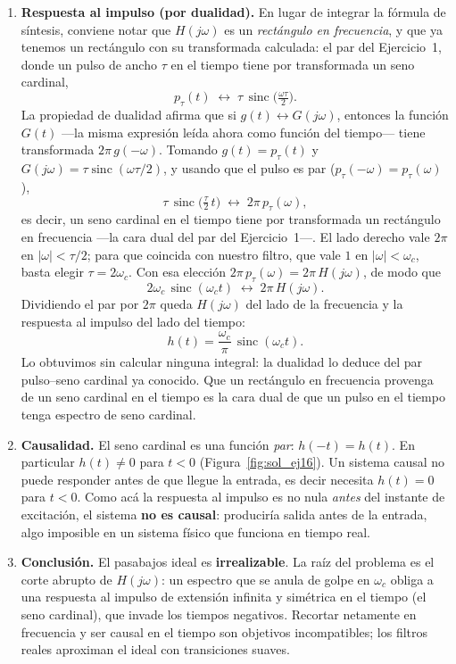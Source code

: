 \documentclass[10pt,a4paper]{article}
\begin{document}
	\begin{enumerate}[label=\textbf{\alph*)}]
		\item \textbf{Respuesta al impulso (por dualidad).} En lugar de integrar la fórmula de síntesis, conviene notar que $H(j\omega)$ es un \emph{rectángulo en frecuencia}, y que ya tenemos un rectángulo con su transformada calculada: el par del Ejercicio~1, donde un pulso de ancho $\tau$ en el tiempo tiene por transformada un seno cardinal,
		\[
			p_\tau(t) \;\leftrightarrow\; \tau\,\operatorname{sinc}\!\Big(\tfrac{\omega\tau}{2}\Big).
		\]
		La propiedad de dualidad afirma que si $g(t)\leftrightarrow G(j\omega)$, entonces la función $G(t)$ ---la misma expresión leída ahora como función del tiempo--- tiene transformada $2\pi\,g(-\omega)$. Tomando $g(t)=p_\tau(t)$ y $G(j\omega)=\tau\operatorname{sinc}(\omega\tau/2)$, y usando que el pulso es par ($p_\tau(-\omega)=p_\tau(\omega)$),
		\[
			\tau\,\operatorname{sinc}\!\Big(\tfrac{\tau}{2}\,t\Big) \;\leftrightarrow\; 2\pi\,p_\tau(\omega),
		\]
		es decir, un seno cardinal en el tiempo tiene por transformada un rectángulo en frecuencia ---la cara dual del par del Ejercicio~1---. El lado derecho vale $2\pi$ en $|\omega|<\tau/2$; para que coincida con nuestro filtro, que vale $1$ en $|\omega|<\omega_c$, basta elegir $\tau=2\omega_c$. Con esa elección $2\pi\,p_\tau(\omega)=2\pi\,H(j\omega)$, de modo que
		\[
			2\omega_c\,\operatorname{sinc}(\omega_c t) \;\leftrightarrow\; 2\pi\,H(j\omega).
		\]
		Dividiendo el par por $2\pi$ queda $H(j\omega)$ del lado de la frecuencia y la respuesta al impulso del lado del tiempo:
		\[
			\boxed{h(t)=\frac{\omega_c}{\pi}\,\operatorname{sinc}(\omega_c t).}
		\]
		Lo obtuvimos sin calcular ninguna integral: la dualidad lo deduce del par pulso--seno cardinal ya conocido. Que un rectángulo en frecuencia provenga de un seno cardinal en el tiempo es la cara dual de que un pulso en el tiempo tenga espectro de seno cardinal.

		\item \textbf{Causalidad.} El seno cardinal es una función \emph{par}: $h(-t)=h(t)$. En particular $h(t)\ne0$ para $t<0$ (Figura~\ref{fig:sol_ej16}). Un sistema causal no puede responder antes de que llegue la entrada, es decir necesita $h(t)=0$ para $t<0$. Como acá la respuesta al impulso es no nula \emph{antes} del instante de excitación, el sistema \textbf{no es causal}: produciría salida antes de la entrada, algo imposible en un sistema físico que funciona en tiempo real.

		\item \textbf{Conclusión.} El pasabajos ideal es \textbf{irrealizable}. La raíz del problema es el corte abrupto de $H(j\omega)$: un espectro que se anula de golpe en $\omega_c$ obliga a una respuesta al impulso de extensión infinita y simétrica en el tiempo (el seno cardinal), que invade los tiempos negativos. Recortar netamente en frecuencia y ser causal en el tiempo son objetivos incompatibles; los filtros reales aproximan el ideal con transiciones suaves.
	\end{enumerate}
\end{document}
